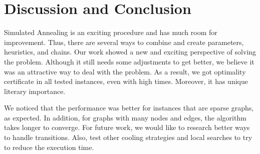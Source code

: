\documentclass[12pt]{article}
\begin{document}
\section{Discussion and Conclusion}
Simulated Annealing is an exciting procedure and has much room for improvement. Thus, there are several ways to combine and create parameters, heuristics, and chains. Our work showed a new and exciting perspective of solving the problem. Although it still needs some adjustments to get better, we believe it was an attractive way to deal with the problem. As a result, we got optimality certificate in all tested instances, even with high times. Moreover, it has unique literary importance.

We noticed that the performance was better for instances that are sparse graphs, as expected. In addition, for graphs with many nodes and edges, the algorithm takes longer to converge. For future work, we would like to research better ways to handle transitions. Also, test other cooling strategies and local searches to try to reduce the execution time.



\end{document}
